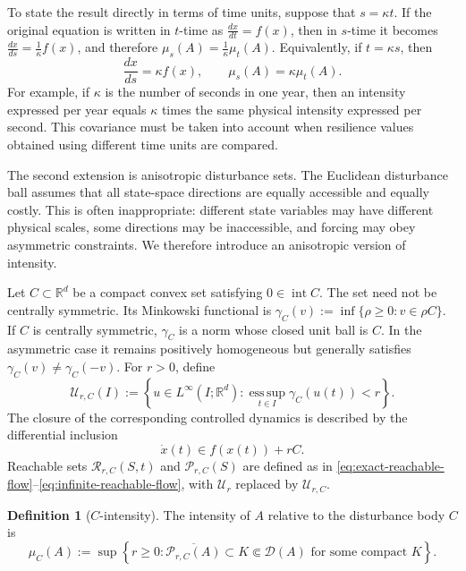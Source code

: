 \documentclass[pdflatex,sn-mathphys-num]{sn-jnl}
\numberwithin{equation}{section}
\theoremstyle{thmstyleone}%
\theoremstyle{definition}
\newtheorem{definition}[theorem]{Definition}
\theoremstyle{remark}
\begin{document}
To state the result directly in terms of time units, suppose that $s=\kappa t$. If the original equation is written in $t$-time as
    $\frac{dx}{dt}=f(x)$,
then in $s$-time it becomes $\frac{dx}{ds}=\frac1\kappa f(x)$, and therefore $\mu_s(A)=\frac1\kappa\mu_t(A)$.
Equivalently, if $t=\kappa s$, then
\[
    \frac{dx}{ds}=\kappa f(x),
    \qquad
    \mu_s(A)=\kappa\mu_t(A).
\]
For example, if $\kappa$ is the number of seconds in one year, then an intensity expressed per year equals $\kappa$ times the same physical intensity expressed per second. This covariance must be taken into account when resilience values obtained using different time units are compared.

The second extension is anisotropic disturbance sets. The Euclidean disturbance ball assumes that all state-space directions are equally accessible and equally costly. This is often inappropriate: different state variables may have different physical scales, some directions may be inaccessible, and forcing may obey asymmetric constraints. We therefore introduce an anisotropic version of intensity.

Let $C\subset\mathbb R^d$ be a compact convex set satisfying $0\in\operatorname{int}C$. The set need not be centrally symmetric. Its Minkowski functional is
$\gamma_C(v)
    :=
    \inf\{\rho\geq0:v\in\rho C\}$.
If $C$ is centrally symmetric, $\gamma_C$ is a norm whose closed unit ball is $C$. In the asymmetric case it remains positively homogeneous but generally satisfies $\gamma_C(v)\neq\gamma_C(-v)$. For $r>0$, define
\[
    \mathcal U_{r,C}(I)
    :=
    \left\{
    u\in L^\infty(I;\mathbb R^d):
    \operatorname*{ess\,sup}_{t\in I}\gamma_C(u(t))<r
    \right\}.
\]
The closure of the corresponding controlled dynamics is described by the differential inclusion
\begin{equation}
\label{eq:convex-differential-inclusion}
    \dot x(t)\in f(x(t))+rC.
\end{equation}
Reachable sets $\mathcal R_{r,C}(S,t)$ and $\mathcal P_{r,C}(S)$ are defined as in \eqref{eq:exact-reachable-flow}--\eqref{eq:infinite-reachable-flow}, with $\mathcal U_r$ replaced by $\mathcal U_{r,C}$.

\begin{definition}[$C$-intensity]
\label{def:C-intensity}
The intensity of $A$ relative to the disturbance body $C$ is
\[
    \mu_C(A)
    :=
    \sup\left\{
    r\geq0:
    \overline{\mathcal P_{r,C}(A)}
    \subset K\Subset\mathcal D(A)
    \text{ for some compact }K
    \right\}.
\]
\end{definition}
\end{document}
